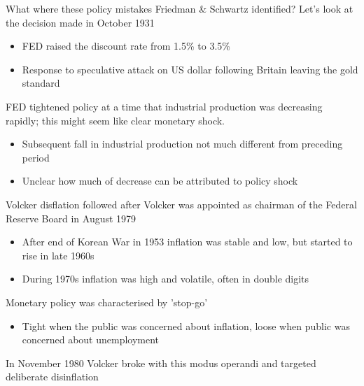 \documentclass{beamer}
\begin{document}
\begin{frame}
  What where these policy mistakes Friedman \& Schwartz identified?
  Let's look at the decision made in October 1931
  \begin{itemize}
    \item FED raised the discount rate from 1.5\% to 3.5\%
    \item Response to speculative attack on US dollar following Britain leaving the gold standard
  \end{itemize}
  \medskip
  FED tightened policy at a time that industrial production was decreasing rapidly; this might seem like clear monetary shock.
  \begin{itemize}
    \item Subsequent fall in industrial production not much different from preceding period
    \item Unclear how much of decrease can be attributed to policy shock
  \end{itemize}
\end{frame}

\begin{frame}
 Volcker  disflation followed after Volcker was appointed as chairman of the Federal Reserve Board in August 1979
 \begin{itemize}
   \item After end of Korean War in 1953 inflation was stable and low, but started to rise in late 1960s
   \item During 1970s inflation was high and volatile, often in double digits
 \end{itemize}
 \medskip
 Monetary policy was characterised by 'stop-go'
 \begin{itemize}
   \item Tight when the public was concerned about inflation, loose when public was concerned about unemployment
 \end{itemize}
  In November 1980 Volcker broke with this modus operandi and targeted deliberate disinflation  
\end{frame}
\end{document}
